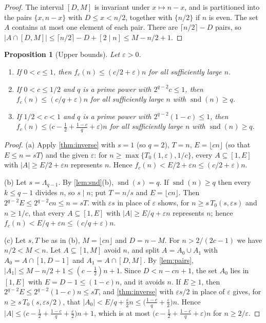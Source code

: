 \documentclass[11pt,reqno]{amsart}
\numberwithin{equation}{section}
\newtheorem{proposition}[theorem]{Proposition}
\theoremstyle{definition}
\theoremstyle{remark}
\newcommand{\eps}{\varepsilon}
\newcommand{\card}[1]{\lvert #1\rvert}
\newcommand{\floor}[1]{\lfloor #1\rfloor}
\newcommand{\ceil}[1]{\lceil #1\rceil}
\newcommand{\snd}{\operatorname{snd}}
\begin{document}
\begin{proof}
The interval $[D,M]$ is invariant under $x\mapsto n-x$, and is partitioned into the pairs $\{x,n-x\}$ with $D\le x<n/2$, together with $\{n/2\}$ if $n$ is even. The set $A$ contains at most one element of each pair. There are $\ceil{n/2}-D$ pairs, so $\card{A\cap[D,M]}\le\ceil{n/2}-D+[2\mid n]\le M-n/2+1$.
\end{proof}

\begin{proposition}[Upper bounds]\label{prop:upper}
Let $\eps>0$.
\begin{enumerate}[label=\textup{(\alph*)}]
\item If $0<c\le1$, then $f_c(n)\le(c/2+\eps)n$ for all sufficiently large $n$.
\item If $0<c\le1/2$ and $q$ is a prime power with $2^{q-2}c\le1$, then $f_c(n)\le(c/q+\eps)n$ for all sufficiently large $n$ with $\snd(n)\ge q$.
\item If $1/2<c<1$ and $q$ is a prime power with $2^{q-2}(1-c)\le1$, then $f_c(n)\le\bigl(c-\frac12+\frac{1-c}q+\eps\bigr)n$ for all sufficiently large $n$ with $\snd(n)\ge q$.
\end{enumerate}
\end{proposition}

\begin{proof}
(a) Apply \cref{thm:inverse} with $s=1$ (so $q=2$), $T=n$, $E=\floor{cn}$ (so that $E\le n=sT$) and the given $\eps$: for $n\ge\max\{T_0(1,\eps),1/c\}$, every $A\subseteq[1,E]$ with $\card A\ge E/2+\eps n$ represents $n$. Hence $f_c(n)<E/2+\eps n\le(c/2+\eps)n$.

(b) Let $s=\Lambda_{q-1}$. By \cref{lem:snd}(b), $\snd(s)=q$. If $\snd(n)\ge q$ then every $k\le q-1$ divides $n$, so $s\mid n$; put $T=n/s$ and $E=\floor{cn}$. Then $2^{q-2}E\le2^{q-2}cn\le n=sT$.  with $\eps s$ in place of $\eps$ shows, for $n\ge s\,T_0(s,\eps s)$ and $n\ge1/c$, that every $A\subseteq[1,E]$ with $\card A\ge E/q+\eps n$ represents $n$; hence $f_c(n)<E/q+\eps n\le(c/q+\eps)n$.

(c) Let $s,T$ be as in (b), $M=\floor{cn}$ and $D=n-M$. For $n>2/(2c-1)$ we have $n/2<M<n$. Let $A\subseteq[1,M]$ avoid $n$, and split $A=A_0\cup A_1$ with $A_0=A\cap[1,D-1]$ and $A_1=A\cap[D,M]$. By \cref{lem:pairs}, $\card{A_1}\le M-n/2+1\le(c-\frac12)n+1$. Since $D<n-cn+1$, the set $A_0$ lies in $[1,E]$ with $E=D-1\le(1-c)n$, and it avoids $n$. If $E\ge1$, then $2^{q-2}E\le2^{q-2}(1-c)n\le sT$, and \cref{thm:inverse} with $\eps s/2$ in place of $\eps$ gives, for $n\ge s\,T_0(s,\eps s/2)$, that $\card{A_0}<E/q+\frac\eps2n\le\bigl(\frac{1-c}q+\frac\eps2\bigr)n$. Hence $\card A\le\bigl(c-\frac12+\frac{1-c}q+\frac\eps2\bigr)n+1$, which is at most $\bigl(c-\frac12+\frac{1-c}q+\eps\bigr)n$ for $n\ge2/\eps$.
\end{proof}
\end{document}
